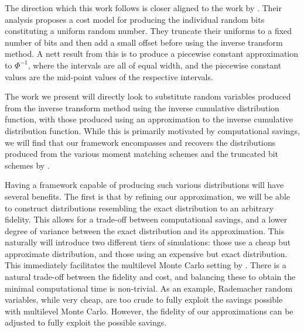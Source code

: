 \documentclass[manuscript]{acmart}
\begin{document}
The direction which this work follows is closer aligned to the work by \citet{giles2019random_quadrature,giles2019random_multilevel}. Their analysis proposes a cost model for producing the individual random bits constituting a uniform random number. They truncate their uniforms to a fixed number of bits and then add a small offset before using the inverse transform method. A nett result from this is to produce a piecewise constant approximation to $ \Phi^{-1} $, where the intervals are all of equal width, and the piecewise constant values are the mid-point values of the respective intervals. 

The work we present will directly look to substitute random variables produced from the inverse transform method using the inverse cumulative distribution function, with those produced using an approximation to the inverse cumulative distribution function. While this is primarily motivated by computational savings, we will find that our framework encompasses and recovers the distributions produced from the various moment matching schemes and the truncated bit schemes by \citet{giles2019random_quadrature,giles2019random_multilevel}. 

Having a framework capable of producing such various distributions will have several benefits. The first is that by refining our approximation, we will be able to construct distributions resembling the exact distribution to an arbitrary fidelity. This allows for a trade-off between computational savings, and a lower degree of variance between the exact distribution and its approximation. This naturally will introduce two different tiers of simulations: those use a cheap but approximate distribution, and those using an expensive but exact distribution. This immediately facilitates the multilevel Monte Carlo setting by \citet{giles2008multilevel}. There is a natural trade-off between the fidelity and cost, and balancing these to obtain the minimal computational time is non-trivial. As an example, Rademacher random variables, while very cheap, are too crude to fully exploit the savings possible with multilevel Monte Carlo. However, the fidelity of our approximations can be adjusted to fully exploit the possible savings. 
\end{document}
